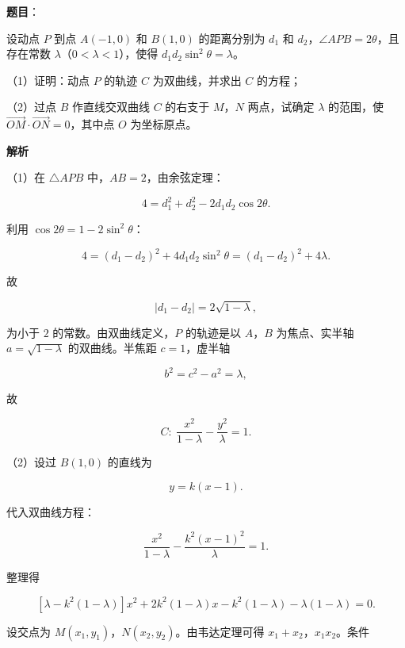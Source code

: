 \begin{answer}

\textbf{题目}：

设动点 $P$ 到点 $A(-1,0)$ 和 $B(1,0)$ 的距离分别为 $d_1$ 和 $d_2$，$\angle APB=2\theta$，且存在常数 $\lambda$（$0<\lambda<1$），使得 $d_1d_2\sin^2\theta=\lambda$。

（1）证明：动点 $P$ 的轨迹 $C$ 为双曲线，并求出 $C$ 的方程；

（2）过点 $B$ 作直线交双曲线 $C$ 的右支于 $M$，$N$ 两点，试确定 $\lambda$ 的范围，使 $\overrightarrow{OM}\cdot\overrightarrow{ON}=0$，其中点 $O$ 为坐标原点。
\nopagebreak[4]
\begin{center}\end{center}
\nopagebreak[4]
\textbf{解析}

（1）在 $\triangle APB$ 中，$AB=2$，由余弦定理：

\nopagebreak[4]
\[4=d_1^2+d_2^2-2d_1d_2\cos2\theta.\]

利用 $\cos2\theta=1-2\sin^2\theta$：

\nopagebreak[4]
\[4=(d_1-d_2)^2+4d_1d_2\sin^2\theta=(d_1-d_2)^2+4\lambda.\]

故

\nopagebreak[4]
\[|d_1-d_2|=2\sqrt{1-\lambda},\]

为小于 $2$ 的常数。由双曲线定义，$P$ 的轨迹是以 $A$，$B$ 为焦点、实半轴 $a=\sqrt{1-\lambda}$ 的双曲线。半焦距 $c=1$，虚半轴

\nopagebreak[4]
\[b^2=c^2-a^2=\lambda,\]

故

\nopagebreak[4]
\[C:\ \frac{x^2}{1-\lambda}-\frac{y^2}{\lambda}=1.\]

（2）设过 $B(1,0)$ 的直线为

\nopagebreak[4]
\[y=k(x-1).\]

代入双曲线方程：

\nopagebreak[4]
\[\frac{x^2}{1-\lambda}-\frac{k^2(x-1)^2}{\lambda}=1.\]

整理得

\nopagebreak[4]
\[[\lambda-k^2(1-\lambda)]x^2+2k^2(1-\lambda)x-k^2(1-\lambda)-\lambda(1-\lambda)=0.\]

设交点为 $M(x_1,y_1)$，$N(x_2,y_2)$。由韦达定理可得 $x_1+x_2$，$x_1x_2$。条件


\end{answer}
